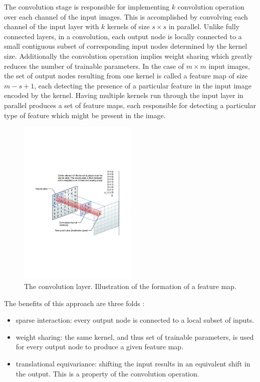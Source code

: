\noindent The convolution stage is responsible for implementing $k$ convolution operation over each channel of the input images. This is accomplished by convolving each channel of the input layer with $k$ kernels of size $s \times s$ in parallel. Unlike fully connected layers, in a convolution, each output node is locally connected to a small contiguous subset of corresponding input nodes determined by the kernel size. Additionally the convolution operation implies weight sharing which greatly reduces the number of trainable parameters. In the case of $m \times m$ input images, the set of output nodes resulting from one kernel is called a feature map of size $m - s + 1$, each detecting the presence of a particular feature in the input image encoded by the kernel. Having multiple kernels run through the input layer in parallel produces a set of feature maps, each responsible for detecting a particular type of feature which might be present in the image. \\

\begin{figure}
\centering
\includegraphics[trim=2cm 7cm 2cm 7cm, clip=true, height=80mm]{Chapter2/convolution.pdf}
\caption{The convolution layer. Illustration of the formation of a feature map.}
\end{figure}

\noindent The benefits of this approach are three folds :

\begin{itemize}
	\item sparse interaction: every output node is connected to a local subset of inputs.
	\item weight sharing: the same kernel, and thus set of trainable parameters, is used for every output node to produce a given feature map. 
	\item translational equivariance: shifting the input results in an equivalent shift in the output. This is a property of the convolution operation.
\end{itemize}

